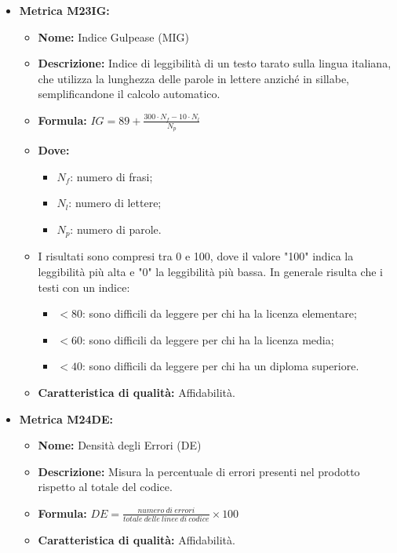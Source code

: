 \begin{itemize}
    \item \textbf{Metrica M23IG:}
            \begin{itemize}
                \item \textbf{Nome:} Indice Gulpease (MIG)
                \item \textbf{Descrizione:} Indice di leggibilità di un testo tarato sulla lingua italiana, che utilizza la lunghezza delle parole in lettere anziché in sillabe, semplificandone il calcolo automatico.
                \item \textbf{Formula:} $IG = 89 + \frac{300 \cdot N_f - 10 \cdot N_l}{N_p}$
                \item \textbf{Dove:}
                      \begin{itemize}
                          \item $N_f$: numero di frasi;
                          \item $N_l$: numero di lettere;
                          \item $N_p$: numero di parole.
                      \end{itemize}
                \item I risultati sono compresi tra 0 e 100, dove il valore "100" indica la leggibilità più alta e "0" la leggibilità più bassa. In generale risulta che i testi con un indice:
                      \begin{itemize}
                          \item $< 80$: sono difficili da leggere per chi ha la licenza elementare;
                          \item $< 60$: sono difficili da leggere per chi ha la licenza media;
                          \item $< 40$: sono difficili da leggere per chi ha un diploma superiore.
                      \end{itemize}
                \item \textbf{Caratteristica di qualità:} Affidabilità.
            \end{itemize}

        \item \textbf{Metrica M24DE:}
                  \begin{itemize}
                      \item \textbf{Nome:} Densità degli Errori (DE)
                      \item \textbf{Descrizione:} Misura la percentuale di errori presenti nel prodotto rispetto al totale del codice.
                      \item \textbf{Formula:} $DE = \frac{numero \ di \ errori}{totale \ delle \ linee \ di \ codice} \times 100$
                      \item \textbf{Caratteristica di qualità:} Affidabilità.
                  \end{itemize}



\end{itemize}
